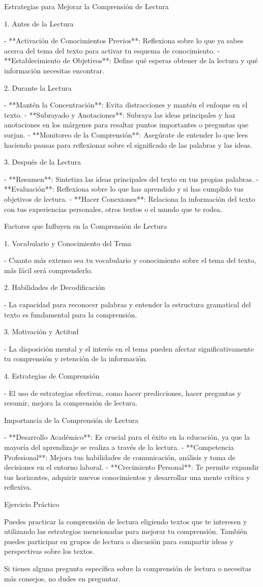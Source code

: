 Estrategias para Mejorar la Comprensión de Lectura

1. Antes de la Lectura

- **Activación de Conocimientos Previos**: Reflexiona sobre lo que ya sabes acerca del tema del texto para activar tu esquema de conocimiento.
- **Establecimiento de Objetivos**: Define qué esperas obtener de la lectura y qué información necesitas encontrar.

2. Durante la Lectura

- **Mantén la Concentración**: Evita distracciones y mantén el enfoque en el texto.
- **Subrayado y Anotaciones**: Subraya las ideas principales y haz anotaciones en los márgenes para resaltar puntos importantes o preguntas que surjan.
- **Monitoreo de la Comprensión**: Asegúrate de entender lo que lees haciendo pausas para reflexionar sobre el significado de las palabras y las ideas.

3. Después de la Lectura

- **Resumen**: Sintetiza las ideas principales del texto en tus propias palabras.
- **Evaluación**: Reflexiona sobre lo que has aprendido y si has cumplido tus objetivos de lectura.
- **Hacer Conexiones**: Relaciona la información del texto con tus experiencias personales, otros textos o el mundo que te rodea.

Factores que Influyen en la Comprensión de Lectura

1. Vocabulario y Conocimiento del Tema

- Cuanto más extenso sea tu vocabulario y conocimiento sobre el tema del texto, más fácil será comprenderlo.

2. Habilidades de Decodificación

- La capacidad para reconocer palabras y entender la estructura gramatical del texto es fundamental para la comprensión.

3. Motivación y Actitud

- La disposición mental y el interés en el tema pueden afectar significativamente tu comprensión y retención de la información.

4. Estrategias de Comprensión

- El uso de estrategias efectivas, como hacer predicciones, hacer preguntas y resumir, mejora la comprensión de lectura.

Importancia de la Comprensión de Lectura

- **Desarrollo Académico**: Es crucial para el éxito en la educación, ya que la mayoría del aprendizaje se realiza a través de la lectura.
- **Competencia Profesional**: Mejora tus habilidades de comunicación, análisis y toma de decisiones en el entorno laboral.
- **Crecimiento Personal**: Te permite expandir tus horizontes, adquirir nuevos conocimientos y desarrollar una mente crítica y reflexiva.

Ejercicio Práctico

Puedes practicar la comprensión de lectura eligiendo textos que te interesen y utilizando las estrategias mencionadas para mejorar tu comprensión. También puedes participar en grupos de lectura o discusión para compartir ideas y perspectivas sobre los textos.

Si tienes alguna pregunta específica sobre la comprensión de lectura o necesitas más consejos, no dudes en preguntar.